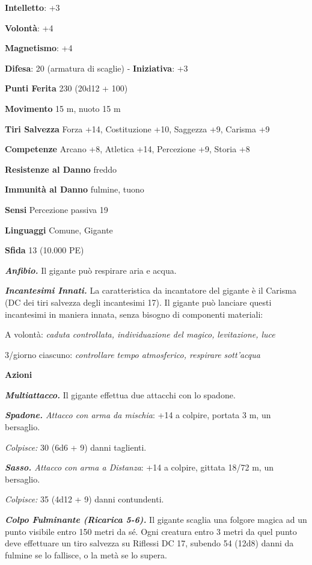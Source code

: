 \begin{multicols}{2}
\textbf{Intelletto}: +3

\textbf{Volontà}: +4

\textbf{Magnetismo}: +4

\textbf{Difesa}: 20 (armatura di scaglie) - \textbf{Iniziativa}: +3

\textbf{Punti Ferita} 230 (20d12 + 100)

\textbf{Movimento} 15 m, nuoto 15 m

\textbf{Tiri Salvezza} Forza +14, Costituzione +10, Saggezza +9, Carisma
+9

\textbf{Competenze} Arcano +8, Atletica +14, Percezione +9, Storia +8

\textbf{Resistenze al Danno} freddo

\textbf{Immunità al Danno} fulmine, tuono

\textbf{Sensi} Percezione passiva 19

\textbf{Linguaggi} Comune, Gigante

\textbf{Sfida} 13 (10.000 PE)

\emph{\textbf{Anfibio.}} Il gigante può respirare aria e acqua.

\emph{\textbf{Incantesimi Innati.}} La caratteristica da incantatore del
gigante è il Carisma (DC dei tiri salvezza degli incantesimi 17). Il
gigante può lanciare questi incantesimi in maniera innata, senza bisogno
di componenti materiali:

A volontà: \emph{caduta controllata, individuazione del magico,}
\emph{levitazione, luce}

3/giorno ciascuno: \emph{controllare tempo atmosferico, respirare}
\emph{sott'acqua}

\textbf{Azioni}

\emph{\textbf{Multiattacco.}} Il gigante effettua due attacchi con lo
spadone.

\emph{\textbf{Spadone.} Attacco con arma da mischia}: +14 a colpire,
portata 3 m, un bersaglio.

\emph{Colpisce:} 30 (6d6 + 9) danni taglienti.

\emph{\textbf{Sasso.} Attacco con arma a Distanza}: +14 a colpire,
gittata 18/72 m, un bersaglio.

\emph{Colpisce:} 35 (4d12 + 9) danni contundenti.

\emph{\textbf{Colpo Fulminante (Ricarica 5-6).}} Il gigante scaglia una
folgore magica ad un punto visibile entro 150 metri da sé. Ogni creatura
entro 3 metri da quel punto deve effettuare un tiro salvezza su Riflessi DC 17, subendo 54 (12d8) danni da fulmine se lo fallisce, o la
metà se lo supera.




\end{multicols}
